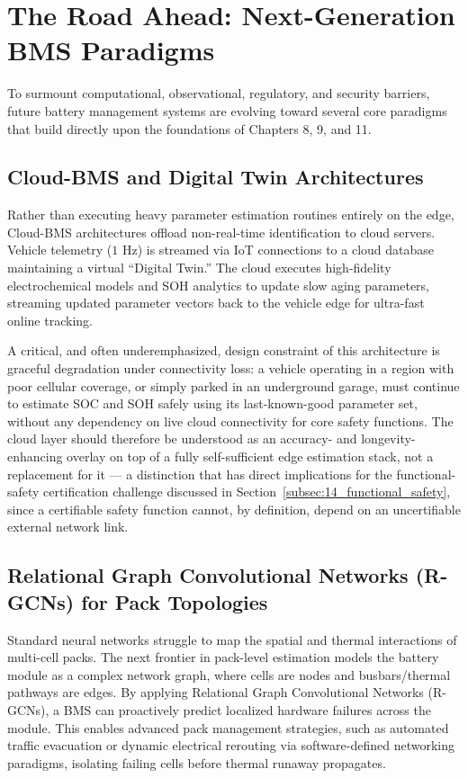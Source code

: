\section{The Road Ahead: Next-Generation BMS Paradigms}
\label{sec:14_road_ahead}

To surmount computational, observational, regulatory, and security barriers, future battery management systems are evolving toward several core paradigms that build directly upon the foundations of Chapters 8, 9, and 11.


\subsection{Cloud-BMS and Digital Twin Architectures}
\label{subsec:14_cloud_bms}

Rather than executing heavy parameter estimation routines entirely on the edge, Cloud-BMS architectures offload non-real-time identification to cloud servers. Vehicle telemetry ($1\text{ Hz}$) is streamed via IoT connections to a cloud database maintaining a virtual ``Digital Twin.'' The cloud executes high-fidelity electrochemical models and SOH analytics to update slow aging parameters, streaming updated parameter vectors back to the vehicle edge for ultra-fast online tracking.

A critical, and often underemphasized, design constraint of this architecture is graceful degradation under connectivity loss: a vehicle operating in a region with poor cellular coverage, or simply parked in an underground garage, must continue to estimate SOC and SOH safely using its last-known-good parameter set, without any dependency on live cloud connectivity for core safety functions. The cloud layer should therefore be understood as an accuracy- and longevity-enhancing overlay on top of a fully self-sufficient edge estimation stack, not a replacement for it — a distinction that has direct implications for the functional-safety certification challenge discussed in Section~\ref{subsec:14_functional_safety}, since a certifiable safety function cannot, by definition, depend on an uncertifiable external network link.

\subsection{Relational Graph Convolutional Networks (R-GCNs) for Pack Topologies}
\label{subsec:14_gcn}

Standard neural networks struggle to map the spatial and thermal interactions of multi-cell packs. The next frontier in pack-level estimation models the battery module as a complex network graph, where cells are nodes and busbars/thermal pathways are edges. By applying Relational Graph Convolutional Networks (R-GCNs), a BMS can proactively predict localized hardware failures across the module. This enables advanced pack management strategies, such as automated traffic evacuation or dynamic electrical rerouting via software-defined networking paradigms, isolating failing cells before thermal runaway propagates.

